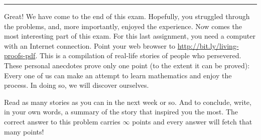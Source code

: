 \documentclass[12pt]{exam}         %
\begin{document}





\par\noindent\rule{\textwidth}{0.4pt}

\medskip

Great! We have come to the end of this exam. Hopefully, you struggled through the problems, and, more importantly, enjoyed the experience. Now comes the most interesting part of this exam. For this last assignment, you need a computer with an Internet connection. Point your web browser to \href{http://bit.ly/living-proofs-pdf}{http://bit.ly/living-proofs-pdf}. This is a compilation of real-life stories of people who persevered. These personal anecdotes prove only one point (to the extent it can be proved): Every one of us can make an attempt to learn mathematics and enjoy the process. In doing so, we will discover ourselves.

Read as many stories as you can in the next week or so. And to conclude, write, in your own words, a summary of the story that inspired you the most. The correct answer to this problem carries $\infty$ points and every answer will fetch that many points!
\end{document}
